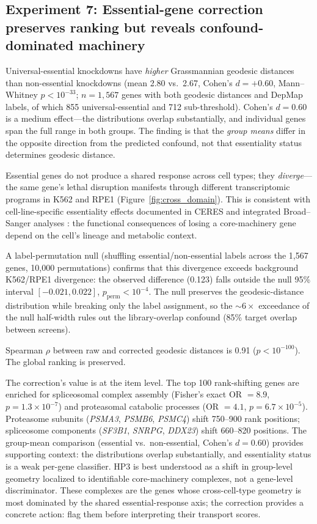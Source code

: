 \documentclass[11pt]{article}
\begin{document}
\subsection{Experiment 7: Essential-gene correction preserves ranking
but reveals confound-dominated machinery}

Universal-essential knockdowns have \emph{higher} Grassmannian geodesic
distances than non-essential knockdowns (mean 2.80 vs.\ 2.67, Cohen's $d =
+0.60$, Mann--Whitney $p < 10^{-33}$; $n = 1{,}567$ genes with both
geodesic distances and DepMap labels, of which 855 universal-essential and
712 sub-threshold). Cohen's $d = 0.60$ is a medium effect---the
distributions overlap substantially, and individual genes span the full
range in both groups. The finding is that the \emph{group means} differ
in the opposite direction from the predicted confound, not that essentiality
status determines geodesic distance.

Essential genes do not produce a shared response across cell types; they
\emph{diverge}---the same gene's lethal disruption manifests through
different transcriptomic programs in K562 and RPE1
(Figure~\ref{fig:cross_domain}). This is consistent with cell-line-specific
essentiality effects documented in CERES \citep{meyers2017ceres} and
integrated Broad--Sanger analyses \citep{pacini2021integrated}: the
functional consequences of losing a core-machinery gene depend on
the cell's lineage and metabolic context.

A label-permutation null (shuffling essential/non-essential labels across
the 1{,}567 genes, 10{,}000 permutations) confirms that this divergence
exceeds background K562/RPE1 divergence: the observed difference (0.123)
falls outside the null 95\% interval $[-0.021, 0.022]$,
$p_{\text{perm}} < 10^{-4}$. The null preserves the geodesic-distance
distribution while breaking only the label assignment, so the ${\sim}6\times$
exceedance of the null half-width rules out the library-overlap confound
(85\% target overlap between screens).

Spearman $\rho$ between raw and corrected geodesic distances is 0.91
($p < 10^{-100}$). The global ranking is preserved.

The correction's value is at the item level. The top 100 rank-shifting
genes are enriched for spliceosomal complex assembly (Fisher's exact
OR $= 8.9$, $p = 1.3 \times 10^{-7}$) and proteasomal catabolic
processes (OR $= 4.1$, $p = 6.7 \times 10^{-5}$). Proteasome subunits
(\emph{PSMA3}, \emph{PSMB6}, \emph{PSMC4}) shift 750--900 rank positions;
spliceosome components (\emph{SF3B1}, \emph{SNRPG}, \emph{DDX23}) shift
660--820 positions. The group-mean comparison (essential vs.\ non-essential,
Cohen's $d = 0.60$) provides supporting context: the distributions overlap
substantially, and essentiality status is a weak per-gene classifier.
HP3 is best understood as a shift in group-level geometry localized to
identifiable core-machinery complexes, not a gene-level discriminator.
These complexes are the genes whose cross-cell-type geometry is most
dominated by the shared essential-response axis; the correction provides a
concrete action: flag them before interpreting their transport scores.
\end{document}

